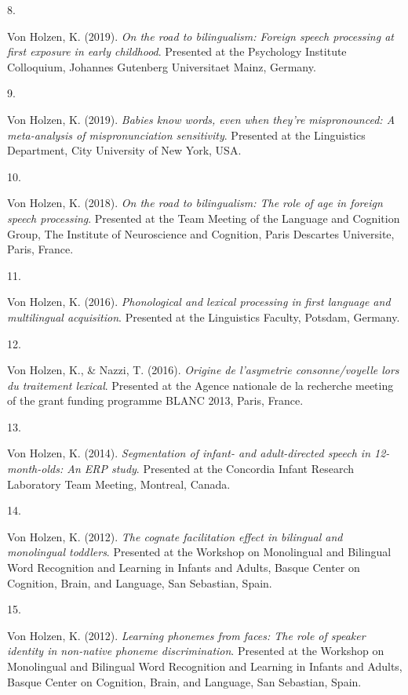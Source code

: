 \documentclass[10pt,a4paper,]{article}
\newlength{\cslhangindent}
\newlength{\csllabelwidth}
\newcommand{\CSLLeftMargin}[1]{\parbox[t]{\csllabelwidth}{\hfill #1~}}
\newcommand{\CSLRightInline}[1]{\parbox[t]{\linewidth - \cslhangindent - \csllabelwidth}{#1}\vspace{0.8ex}}
\begin{document}
\leavevmode{}%
\CSLLeftMargin{8. }%
\CSLRightInline{Von Holzen, K. (2019). \emph{On the road to
bilingualism: Foreign speech processing at first exposure in early
childhood}. Presented at the Psychology Institute Colloquium, Johannes
Gutenberg Universitaet Mainz, Germany.}

\leavevmode{}%
\CSLLeftMargin{9. }%
\CSLRightInline{Von Holzen, K. (2019). \emph{Babies know words, even
when they're mispronounced: A meta-analysis of mispronunciation
sensitivity}. Presented at the Linguistics Department, City University
of New York, USA.}

\leavevmode{}%
\CSLLeftMargin{10. }%
\CSLRightInline{Von Holzen, K. (2018). \emph{On the road to
bilingualism: The role of age in foreign speech processing}. Presented
at the Team Meeting of the Language and Cognition Group, The Institute
of Neuroscience and Cognition, Paris Descartes Universite, Paris,
France.}

\leavevmode{}%
\CSLLeftMargin{11. }%
\CSLRightInline{Von Holzen, K. (2016). \emph{Phonological and lexical
processing in first language and multilingual acquisition}. Presented at
the Linguistics Faculty, Potsdam, Germany.}

\leavevmode{}%
\CSLLeftMargin{12. }%
\CSLRightInline{Von Holzen, K., \& Nazzi, T. (2016). \emph{Origine de
l'asymetrie consonne/voyelle lors du traitement lexical}. Presented at
the Agence nationale de la recherche meeting of the grant funding
programme BLANC 2013, Paris, France.}

\leavevmode{}%
\CSLLeftMargin{13. }%
\CSLRightInline{Von Holzen, K. (2014). \emph{Segmentation of infant- and
adult-directed speech in 12-month-olds: An ERP study}. Presented at the
Concordia Infant Research Laboratory Team Meeting, Montreal, Canada.}

\leavevmode{}%
\CSLLeftMargin{14. }%
\CSLRightInline{Von Holzen, K. (2012). \emph{The cognate facilitation
effect in bilingual and monolingual toddlers}. Presented at the Workshop
on Monolingual and Bilingual Word Recognition and Learning in Infants
and Adults, Basque Center on Cognition, Brain, and Language, San
Sebastian, Spain.}

\leavevmode{}%
\CSLLeftMargin{15. }%
\CSLRightInline{Von Holzen, K. (2012). \emph{Learning phonemes from
faces: The role of speaker identity in non-native phoneme
discrimination}. Presented at the Workshop on Monolingual and Bilingual
Word Recognition and Learning in Infants and Adults, Basque Center on
Cognition, Brain, and Language, San Sebastian, Spain.}
\end{document}
